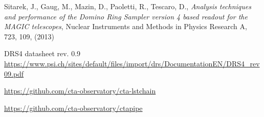 \documentclass[a4paper,11pt,twoside]{article}
\begin{document}
\begin{thebibliography}{9}
Sitarek, J., Gaug, M., Mazin, D., Paoletti, R., Tescaro, D., \textit{Analysis techniques and performance of the Domino Ring Sampler version 4 based readout for the MAGIC
telescopes}, Nuclear Instruments and Methods in Physics Research A, 723, 109, (2013)

DRS4 datasheet rev. 0.9
\url{https://www.psi.ch/sites/default/files/import/drs/DocumentationEN/DRS4_rev09.pdf}

\url{https://github.com/cta-observatory/cta-lstchain}

\url{https://github.com/cta-observatory/ctapipe}
\end{thebibliography}
\end{document}
